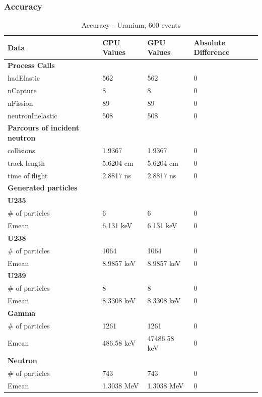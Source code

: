 \documentclass[12pt]{article}
\begin{document}
	\subsubsection{Accuracy}
		\begin{table}[H]
		\centering
		\caption{Accuracy - Uranium, 600 events}\label{sys4Acc}
		\begin{tabular}{llll}
		\toprule
		\bf Data &  \bf CPU Values &  \bf GPU Values &  \bf Absolute Difference\\\midrule
		\bf Process Calls&&&\\
		hadElastic&562&562&0\\
		nCapture&8&8&0\\
		nFission&89&89&0\\
		neutronInelastic&508&508&0\\ 

		\midrule
		\bf Parcours of incident neutron&&&\\
		collisions&1.9367&1.9367&0\\
		track length&5.6204 cm&5.6204 cm&0\\
		time of flight&2.8817 ns&2.8817 ns&0\\

		\midrule
		\bf Generated particles&&&\\
		
		\bf{U235}&&&\\
		\# of particles&6&6&0\\
		Emean&6.131 keV&6.131 keV&0\\
		
		\bf{U238}&&&\\
		\# of particles&1064&1064&0\\
		Emean&8.9857 keV&8.9857 keV&0\\
		
		\bf{U239}&&&\\
		\# of particles&8&8&0\\
		Emean&8.3308 keV&8.3308 keV&0\\
		
		\bf{Gamma}&&&\\
		\# of particles&1261&1261&0\\
		Emean&486.58 keV&47486.58 keV&0\\
		
		\bf{Neutron}&&&\\
		\# of particles&743&743&0\\
		Emean&1.3038 MeV&1.3038 MeV&0\\\bottomrule
		\end{tabular}
		\end{table}
\end{document}
